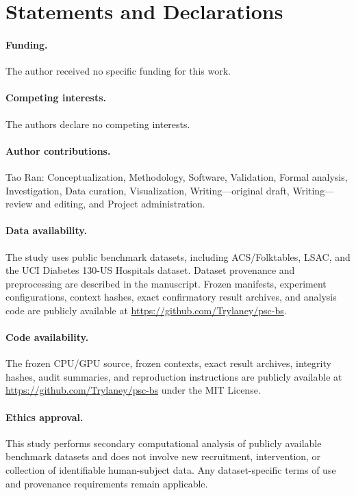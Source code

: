 \documentclass[10pt]{article}
\begin{document}
\section*{Statements and Declarations}

\paragraph{Funding.}
The author received no specific funding for this work.

\paragraph{Competing interests.}
The authors declare no competing interests.

\paragraph{Author contributions.}
Tao Ran: Conceptualization, Methodology, Software, Validation, Formal analysis, Investigation, Data curation, Visualization, Writing---original draft, Writing---review and editing, and Project administration.

\paragraph{Data availability.}
The study uses public benchmark datasets, including ACS/Folktables, LSAC, and the UCI Diabetes 130-US Hospitals dataset. Dataset provenance and preprocessing are described in the manuscript. Frozen manifests, experiment configurations, context hashes, exact confirmatory result archives, and analysis code are publicly available at \url{https://github.com/Trylaney/psc-bs}.

\paragraph{Code availability.}
The frozen CPU/GPU source, frozen contexts, exact result archives, integrity hashes, audit summaries, and reproduction instructions are publicly available at \url{https://github.com/Trylaney/psc-bs} under the MIT License.

\paragraph{Ethics approval.}
This study performs secondary computational analysis of publicly available benchmark datasets and does not involve new recruitment, intervention, or collection of identifiable human-subject data. Any dataset-specific terms of use and provenance requirements remain applicable.
\end{document}
